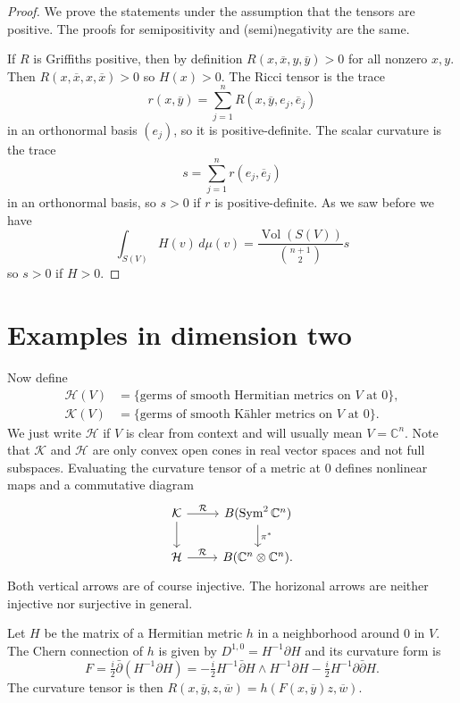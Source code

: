\documentclass[10pt,a4paper]{amsart}
\theoremstyle{definition}
\def\ov#1{\overline{#1}}
\newcommand{\kk}[1]{\mathbb{#1}}
\newcommand{\cc}[1]{\mathcal{#1}}
\DeclareMathOperator{\Vol}{Vol}
\begin{document}
\begin{proof}
We prove the statements under the assumption that the tensors are positive.
The proofs for semipositivity and (semi)negativity are the same.

If $R$ is Griffiths positive, then by definition $R(x, \ov x, y, \ov y) > 0$
for all nonzero $x, y$. Then $R(x, \ov x, x, \ov x) > 0$ so $H(x) > 0$.
The Ricci tensor is the trace
$$
r(x, \ov y) = \sum_{j = 1}^n R(x, \ov y, e_j, \ov e_j)
$$
in an orthonormal basis $(e_j)$, so it is positive-definite.
The scalar curvature is the trace
$$
s = \sum_{j=1}^n r(e_j, \ov e_j)
$$
in an orthonormal basis, so $s > 0$ if $r$ is positive-definite.
As we saw before we have
\[
\int_{S(V)} H(v) \, d\mu(v)
= \frac{\Vol(S(V))}{\binom{n+1}{2}} s
\]
so $s > 0$ if $H > 0$.
\end{proof}



\section{Examples in dimension two}

Now define
\begin{align*}
\cc H(V)
&= \{ \text{germs of smooth Hermitian metrics on $V$ at $0$} \},
\\
\cc K(V)
&= \{ \text{germs of smooth K\"ahler metrics on $V$ at $0$} \}.
\end{align*}
We just write $\cc H$ if $V$ is clear from context and will usually mean $V =
\kk C^n$. Note that $\cc K$ and $\cc H$ are only convex open cones in real
vector spaces and not full subspaces.
Evaluating the curvature tensor of a metric at $0$ defines nonlinear maps and a
commutative diagram
$$
\begin{tikzcd}
\cc K \ar[d] \ar[r,"\cc R"] & B(\operatorname{Sym}^2 \kk C^n)\ar[d,"\pi^*"]
\\
\cc H \ar[r, "\cc R"] & B(\kk C^n \otimes \kk C^n).
\end{tikzcd}
$$
Both vertical arrows are of course injective.
The horizonal arrows are neither injective nor surjective in general.


Let $H$ be the matrix of a Hermitian metric $h$ in a neighborhood around $0$ in
$V$. The Chern connection of $h$ is given by $D^{1,0} = H^{-1}\partial H$ and its
curvature form is
$$
F = \tfrac i2 \bar\partial(H^{-1}\partial H)
= - \tfrac i2 H^{-1} \bar\partial H \wedge H^{-1} \partial H
- \tfrac i2 H^{-1} \partial \bar\partial H.
$$
The curvature tensor is then $R(x,\ov y, z, \ov w) = h(F(x, \ov y) z, \ov w)$.
\end{document}
